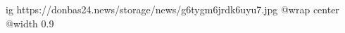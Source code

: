  
 
 
 
 

\ifcmt
  ig https://donbas24.news/storage/news/g6tygm6jrdk6uyu7.jpg
  @wrap center
  @width 0.9
\fi
